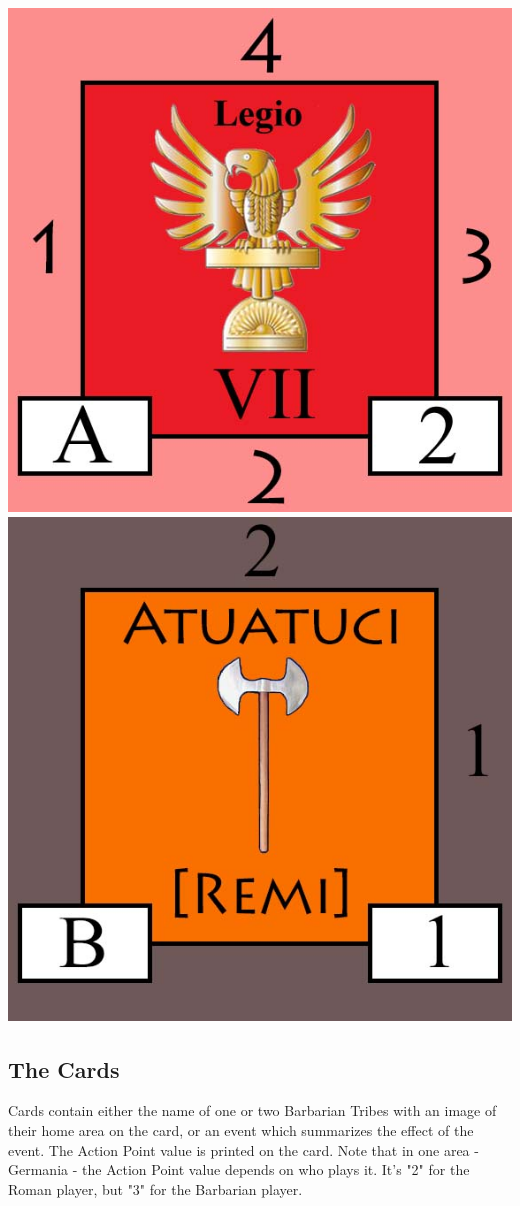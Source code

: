 \includegraphics{images/legion7_2nd_ed}
\hspace{1em}
\includegraphics{images/aduatuci_2nd_ed}

\par
\subsection{The Cards}
Cards contain either the name of one or two Barbarian Tribes with an image of their home area on the card, or an event which summarizes the effect of the event. The Action Point value is printed on the card. Note that in one area - Germania - the Action Point value depends on who plays it. It's "2" for the Roman player, but "3" for the Barbarian player.
